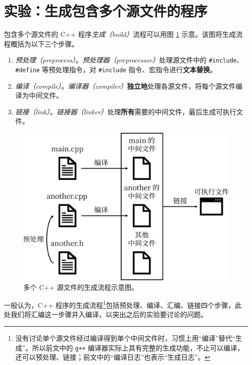 
\section{实验：生成包含多个源文件的程序\label{sec:experiment-1}}

包含多个源文件的 C++ 程序\emph{生成（build）}流程可以用图 \ref{fig:build-flow} 示意。该图将生成流程概括为以下三个步骤。

\begin{enumerate}
	\item \emph{预处理（preprocess）}。\emph{预处理器（preprocessor）}处理源文件中的 \lstinline[language={[17]C++}]{#include}、\lstinline[language={[17]C++}]{#define} 等预处理指令，对 \lstinline[language={[17]C++}]{#include} 指令、宏指令进行\textbf{文本替换}。
	\item \emph{编译（compile）}。\emph{编译器（compiler）}\textbf{独立地}处理各源文件，将每个源文件编译为中间文件。
	\item \emph{链接（link）}。\emph{链接器（linker）}处理\textbf{所有}需要的中间文件，最后生成可执行文件。
\end{enumerate}

\begin{figure}[H]
	\centering
	\includegraphics[scale=0.15]{assets/build-flow}
	\caption{多个 C++ 源文件的生成流程示意图。}
	\label{fig:build-flow}
\end{figure}

一般认为，C++ 程序的生成流程\footnote{没有讨论单个源文件经过编译得到单个中间文件时，习惯上用“编译”替代“生成”。所以前文中的 \lstinline[language={}]{g++} 编译器实际上具有完整的生成功能，不止可以编译，还可以预处理、链接；前文中的“编译日志”也表示“生成日志”。}包括预处理、编译、汇编、链接四个步骤，此处我们将汇编这一步骤并入编译，以突出之后的实验要讨论的问题。

